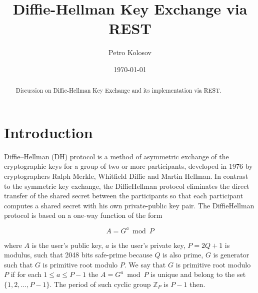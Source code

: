 \documentclass[12pt,letterpaper,oneside,reqno]{amsart}
\title[Diffie-Hellman Key Exchange via REST]
{Diffie-Hellman Key Exchange via REST}
\author[Petro Kolosov]{Petro Kolosov}
\date{\today}
\numberwithin{equation}{section}
\begin{document}
    \begin{abstract}
        Discussion on Diffie-Hellman Key Exchange and its implementation via REST.
    \end{abstract}

    \maketitle

    \tableofcontents


    \section{Introduction} \label{sec:introduction}
    Diffie--Hellman (DH) protocol is a method of asymmetric exchange
    of the cryptographic keys for a group of two or more participants,
    developed in 1976 by cryptographers Ralph Merkle, Whitfield Diffie and Martin Hellman.
    In contrast to the symmetric key exchange,
    the Diffie\textendash Hellman protocol eliminates the direct transfer of the shared secret
    between the participants so that each participant computes a shared secret with his own private-public key pair.
    The Diffie\textendash Hellman protocol is based on a one-way function of the form

    \begin{equation}
        A = G ^ a \bmod P \label{eq:equation}
    \end{equation}

    where $A$ is the user's public key,
    $a$ is the user's private key,
    $P=2Q+1$ is modulus, such that 2048 bits safe-prime because $Q$ is also prime,
    $G$ is generator such that $G$ is primitive root modulo $P$.
    We say that $G$ is primitive root modulo $P$ if for each $1 \leq a \leq P - 1$ the $A = G ^ a \bmod P$
    is unique and belong to the set $\{1, 2, \dots, P-1\}$.
    The period of such cyclic group $\mathbb{Z}_{P}$ is $P-1$ then.
\end{document}
